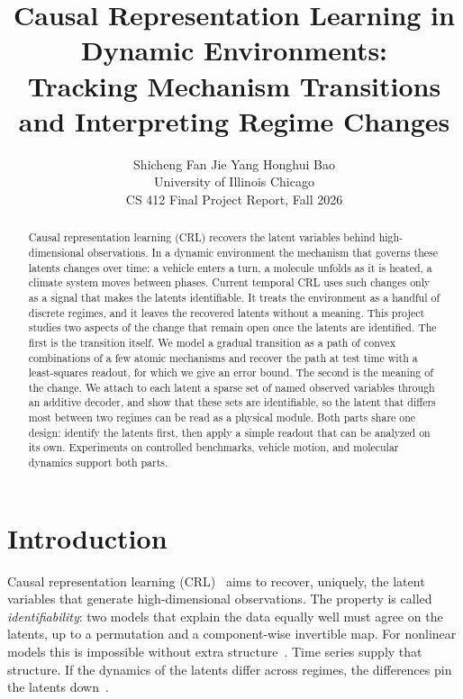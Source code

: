 \documentclass[10pt,twocolumn,letterpaper]{article}
\title{Causal Representation Learning in Dynamic Environments:\\Tracking Mechanism Transitions and Interpreting Regime Changes}
\author{Shicheng Fan \qquad Jie Yang \qquad Honghui Bao\\
University of Illinois Chicago\\
{\small CS 412 Final Project Report, Fall 2026}
}
\theoremstyle{definition}
\begin{document}
\maketitle

\begin{abstract}
Causal representation learning (CRL) recovers the latent variables behind high-dimensional observations.
In a dynamic environment the mechanism that governs these latents changes over time: a vehicle enters a turn, a molecule unfolds as it is heated, a climate system moves between phases.
Current temporal CRL uses such changes only as a signal that makes the latents identifiable.
It treats the environment as a handful of discrete regimes, and it leaves the recovered latents without a meaning.
This project studies two aspects of the change that remain open once the latents are identified.
The first is the transition itself.
We model a gradual transition as a path of convex combinations of a few atomic mechanisms and recover the path at test time with a least-squares readout, for which we give an error bound.
The second is the meaning of the change.
We attach to each latent a sparse set of named observed variables through an additive decoder, and show that these sets are identifiable, so the latent that differs most between two regimes can be read as a physical module.
Both parts share one design: identify the latents first, then apply a simple readout that can be analyzed on its own.
Experiments on controlled benchmarks, vehicle motion, and molecular dynamics support both parts.
\end{abstract}

\section{Introduction}
\label{sec:intro}

Causal representation learning (CRL)~\cite{scholkopf2021toward,zhang2024causal} aims to recover, uniquely, the latent variables that generate high-dimensional observations.
The property is called \emph{identifiability}: two models that explain the data equally well must agree on the latents, up to a permutation and a component-wise invertible map.
For nonlinear models this is impossible without extra structure~\cite{hyvarinen1999nonlinear,locatello2019challenging}.
Time series supply that structure.
If the dynamics of the latents differ across regimes, the differences pin the latents down~\cite{hyvarinen2016unsupervised,yao2022temporally}.
\end{document}
